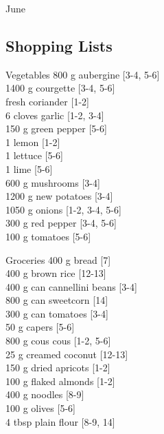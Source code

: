 \begin{menu}{June}
    \subsection*{Shopping Lists}
      \begin{shoppinglist}{Vegetables}
      800 g aubergine {\scriptsize[3-4, 5-6]}\\
      1400 g courgette {\scriptsize[3-4, 5-6]}\\
       fresh coriander {\scriptsize[1-2]}\\
      6 cloves garlic {\scriptsize[1-2, 3-4]}\\
      150 g green pepper {\scriptsize[5-6]}\\
      1  lemon {\scriptsize[1-2]}\\
      1  lettuce {\scriptsize[5-6]}\\
      1  lime {\scriptsize[5-6]}\\
      600 g mushrooms {\scriptsize[3-4]}\\
      1200 g new potatoes {\scriptsize[3-4]}\\
      1050 g onions {\scriptsize[1-2, 3-4, 5-6]}\\
      300 g red pepper {\scriptsize[3-4, 5-6]}\\
      100 g tomatoes {\scriptsize[5-6]}\\
      \end{shoppinglist}%
      \begin{shoppinglist}{Groceries}
      400 g bread {\scriptsize[7]}\\
      400 g brown rice {\scriptsize[12-13]}\\
      400 g can cannellini beans {\scriptsize[3-4]}\\
      800 g can sweetcorn {\scriptsize[14]}\\
      300 g can tomatoes {\scriptsize[3-4]}\\
      50 g capers {\scriptsize[5-6]}\\
      800 g cous cous {\scriptsize[1-2, 5-6]}\\
      25 g creamed coconut {\scriptsize[12-13]}\\
      150 g dried apricots {\scriptsize[1-2]}\\
      100 g flaked almonds {\scriptsize[1-2]}\\
      400 g noodles {\scriptsize[8-9]}\\
      100 g olives {\scriptsize[5-6]}\\
      4 tbsp plain flour {\scriptsize[8-9, 14]}\\

\end{shoppinglist}
\end{menu}
